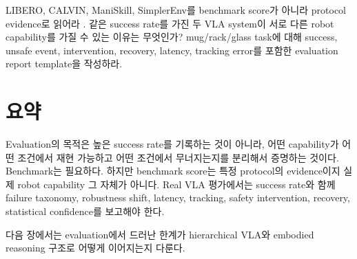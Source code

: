 \chapterwork
{LIBERO, CALVIN, ManiSkill, SimplerEnv를 benchmark score가 아니라 protocol evidence로 읽어라 \cite{libero2023,calvin2022,maniskill22023,simplerenv2024}.}
{같은 success rate를 가진 두 VLA system이 서로 다른 robot capability를 가질 수 있는 이유는 무엇인가?}
{mug/rack/glass task에 대해 success, unsafe event, intervention, recovery, latency, tracking error를 포함한 evaluation report template을 작성하라.}

\section{요약}

Evaluation의 목적은 높은 success rate를 기록하는 것이 아니라, 어떤 capability가 어떤 조건에서 재현 가능하고 어떤 조건에서 무너지는지를 분리해서 증명하는 것이다. Benchmark는 필요하다. 하지만 benchmark score는 특정 protocol의 evidence이지 실제 robot capability 그 자체가 아니다. Real VLA 평가에서는 success rate와 함께 failure taxonomy, robustness shift, latency, tracking, safety intervention, recovery, statistical confidence를 보고해야 한다.

다음 장에서는 evaluation에서 드러난 한계가 hierarchical VLA와 embodied reasoning 구조로 어떻게 이어지는지 다룬다.
